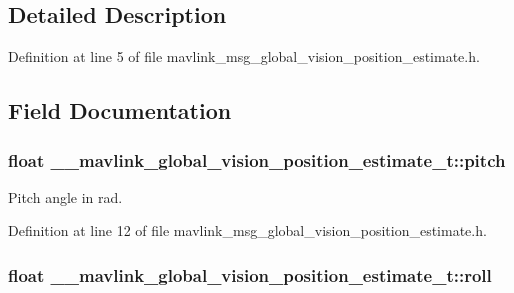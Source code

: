 \subsection{Detailed Description}


Definition at line 5 of file mavlink\-\_\-msg\-\_\-global\-\_\-vision\-\_\-position\-\_\-estimate.\-h.



\subsection{Field Documentation}
\hypertarget{struct____mavlink__global__vision__position__estimate__t_ac36453fff07f0620a7c81c5eb31d8ce4}{
\subsubsection[{pitch}]{\setlength{\rightskip}{0pt plus 5cm}float \-\_\-\-\_\-mavlink\-\_\-global\-\_\-vision\-\_\-position\-\_\-estimate\-\_\-t\-::pitch}}\label{struct____mavlink__global__vision__position__estimate__t_ac36453fff07f0620a7c81c5eb31d8ce4}


Pitch angle in rad. 



Definition at line 12 of file mavlink\-\_\-msg\-\_\-global\-\_\-vision\-\_\-position\-\_\-estimate.\-h.

\hypertarget{struct____mavlink__global__vision__position__estimate__t_a1cbae0267ad81e4c6ac223c433ee5941}{
\subsubsection[{roll}]{\setlength{\rightskip}{0pt plus 5cm}float \-\_\-\-\_\-mavlink\-\_\-global\-\_\-vision\-\_\-position\-\_\-estimate\-\_\-t\-::roll}}\label{struct____mavlink__global__vision__position__estimate__t_a1cbae0267ad81e4c6ac223c433ee5941}


